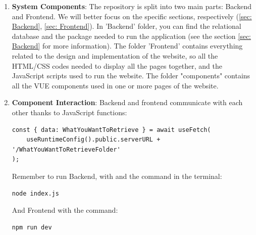 \documentclass[12pt]{article}
\begin{document}
\begin{enumerate}
    \item \textbf{System Components}: The repository is split into two main parts: Backend and Frontend. We will better focus on the specific sections, respectively (\ref{sec: Backend}, \ref{sec: Frontend}). In 'Backend' folder, you can find the relational database and the package needed to run the application (see the section \ref{sec: Backend} for more information). The folder 'Frontend' contains everything related to the design and implementation of the website, so all the HTML/CSS codes needed to display all the pages together, and the JavaScript scripts used to run the website. The folder "components" contains all the VUE components used in one or more pages of the website. %
    
    \item \textbf{Component Interaction}: Backend and frontend communicate with each other thanks to JavaScript functions:
    
\begin{lstlisting}
const { data: WhatYouWantToRetrieve } = await useFetch(
    useRuntimeConfig().public.serverURL + '/WhatYouWantToRetrieveFolder'
);
\end{lstlisting}

Remember to run Backend, with and the command in the terminal:

\begin{lstlisting}
node index.js
\end{lstlisting}

And Frontend with the command:

\begin{lstlisting}
npm run dev
\end{lstlisting}


\end{enumerate}
\end{document}
